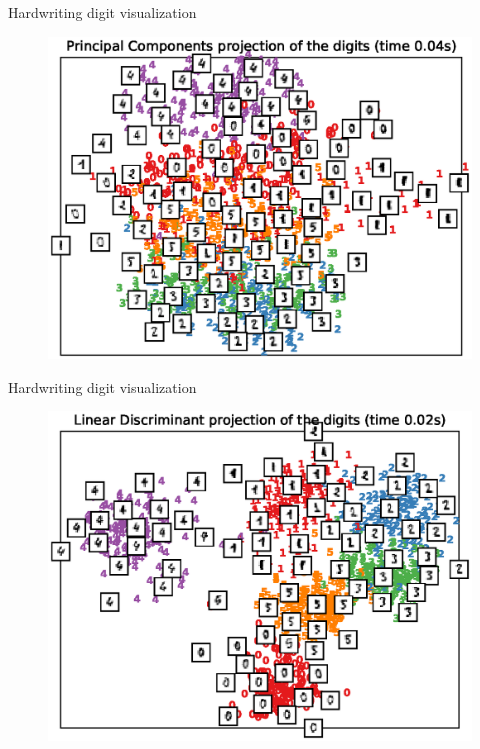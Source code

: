 \documentclass[10pt]{beamer}
\begin{document}
\begin{frame}{Hardwriting digit visualization}
\begin{figure}
\centering
\includegraphics[scale=0.65]{./image/experiment/pca.eps}
\end{figure}
\end{frame}


\begin{frame}{Hardwriting digit visualization}
\begin{figure}
\centering
\includegraphics[scale=0.65]{./image/experiment/lda.eps}
\end{figure}
\end{frame}
\end{document}
